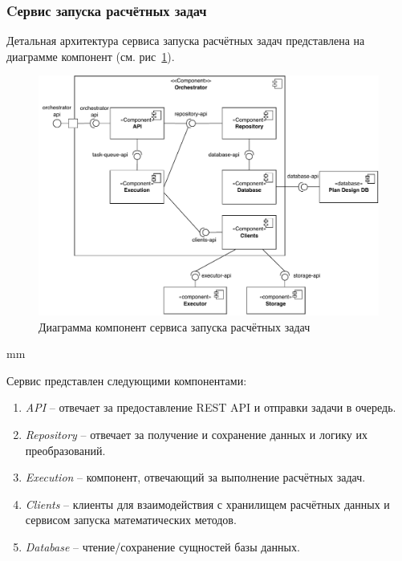 \subsubsection{\large{Cервис запуска расчётных задач}}

Детальная архитектура сервиса запуска расчётных задач представлена на диаграмме компонент
(см. рис\ \ref{pic:architecture__orchestrator-component}).

\begin{figure}[H]
	\hspace*{-2.5 cm}\includegraphics[width=\textwidth]{architecture/pictures/orchestrator/component_common}
	\caption{Диаграмма компонент сервиса запуска расчётных задач}
	\label{pic:architecture__orchestrator-component}
\end{figure}
 mm

Сервис представлен следующими компонентами:
\begin{enumerate}
	\item {
		\textit{API} -- отвечает за предоставление REST API и отправки задачи в очередь.
	}
	\item {
		\textit{Repository} -- отвечает за получение и сохранение данных и логику их преобразований.
	}
	\item {
		\textit{Execution} -- компонент, отвечающий за выполнение расчётных задач.
	}
	\item {
		\textit{Clients} -- клиенты для взаимодействия с хранилищем расчётных данных
		и сервисом запуска математических методов.
	}
	\item {
		\textit{Database} -- чтение/сохранение сущностей базы данных.
	}
\end{enumerate}

